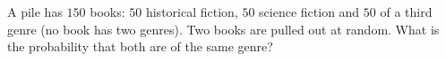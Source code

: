 A pile has $150$ books: $50$ historical fiction, $50$ science fiction and $50$ of a third genre (no book has two genres). Two books are pulled out at random. What is the probability that both are of the same genre?
